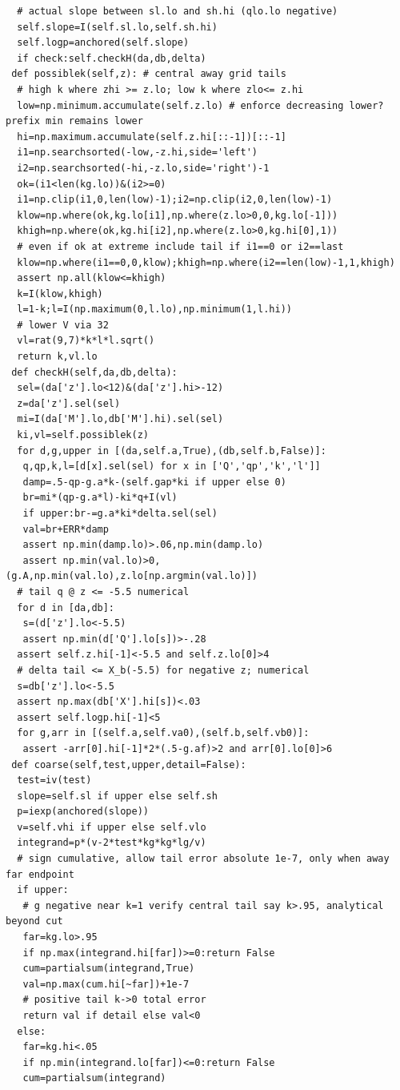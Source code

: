 \documentclass[11pt,a4paper]{article}
\numberwithin{equation}{section}
\theoremstyle{definition}
\theoremstyle{remark}
\begin{document}
\begin{lstlisting}
  # actual slope between sl.lo and sh.hi (qlo.lo negative)
  self.slope=I(self.sl.lo,self.sh.hi)
  self.logp=anchored(self.slope)
  if check:self.checkH(da,db,delta)
 def possiblek(self,z): # central away grid tails
  # high k where zhi >= z.lo; low k where zlo<= z.hi
  low=np.minimum.accumulate(self.z.lo) # enforce decreasing lower? prefix min remains lower
  hi=np.maximum.accumulate(self.z.hi[::-1])[::-1]
  i1=np.searchsorted(-low,-z.hi,side='left')
  i2=np.searchsorted(-hi,-z.lo,side='right')-1
  ok=(i1<len(kg.lo))&(i2>=0)
  i1=np.clip(i1,0,len(low)-1);i2=np.clip(i2,0,len(low)-1)
  klow=np.where(ok,kg.lo[i1],np.where(z.lo>0,0,kg.lo[-1]))
  khigh=np.where(ok,kg.hi[i2],np.where(z.lo>0,kg.hi[0],1))
  # even if ok at extreme include tail if i1==0 or i2==last
  klow=np.where(i1==0,0,klow);khigh=np.where(i2==len(low)-1,1,khigh)
  assert np.all(klow<=khigh)
  k=I(klow,khigh)
  l=1-k;l=I(np.maximum(0,l.lo),np.minimum(1,l.hi))
  # lower V via 32
  vl=rat(9,7)*k*l*l.sqrt()
  return k,vl.lo
 def checkH(self,da,db,delta):
  sel=(da['z'].lo<12)&(da['z'].hi>-12)
  z=da['z'].sel(sel)
  mi=I(da['M'].lo,db['M'].hi).sel(sel)
  ki,vl=self.possiblek(z)
  for d,g,upper in [(da,self.a,True),(db,self.b,False)]:
   q,qp,k,l=[d[x].sel(sel) for x in ['Q','qp','k','l']]
   damp=.5-qp-g.a*k-(self.gap*ki if upper else 0)
   br=mi*(qp-g.a*l)-ki*q+I(vl)
   if upper:br-=g.a*ki*delta.sel(sel)
   val=br+ERR*damp
   assert np.min(damp.lo)>.06,np.min(damp.lo)
   assert np.min(val.lo)>0,(g.A,np.min(val.lo),z.lo[np.argmin(val.lo)])
  # tail q @ z <= -5.5 numerical
  for d in [da,db]:
   s=(d['z'].lo<-5.5)
   assert np.min(d['Q'].lo[s])>-.28
  assert self.z.hi[-1]<-5.5 and self.z.lo[0]>4
  # delta tail <= X_b(-5.5) for negative z; numerical
  s=db['z'].lo<-5.5
  assert np.max(db['X'].hi[s])<.03
  assert self.logp.hi[-1]<5
  for g,arr in [(self.a,self.va0),(self.b,self.vb0)]:
   assert -arr[0].hi[-1]*2*(.5-g.af)>2 and arr[0].lo[0]>6
 def coarse(self,test,upper,detail=False):
  test=iv(test)
  slope=self.sl if upper else self.sh
  p=iexp(anchored(slope))
  v=self.vhi if upper else self.vlo
  integrand=p*(v-2*test*kg*kg*lg/v)
  # sign cumulative, allow tail error absolute 1e-7, only when away far endpoint
  if upper:
   # g negative near k=1 verify central tail say k>.95, analytical beyond cut
   far=kg.lo>.95
   if np.max(integrand.hi[far])>=0:return False
   cum=partialsum(integrand,True)
   val=np.max(cum.hi[~far])+1e-7
   # positive tail k->0 total error
   return val if detail else val<0
  else:
   far=kg.hi<.05
   if np.min(integrand.lo[far])<=0:return False
   cum=partialsum(integrand)

\end{lstlisting}
\end{document}
